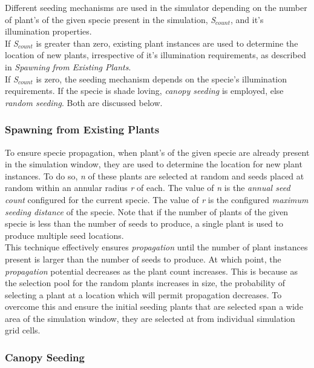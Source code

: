 Different seeding mechanisms are used in the simulator depending on the number of plant's of the given specie present in the simulation, \textit{S$_{count}$}, and it's illumination properties.\\
If \textit{S$_{count}$} is greater than zero, existing plant instances are used to determine the location of new plants, irrespective of it's illumination requirements, as described in \textit{Spawning from Existing Plants}.\\
If \textit{S$_{count}$} is zero, the seeding mechanism depends on the specie's illumination requirements. If the specie is shade loving, \textit{canopy seeding} is employed, else \textit{random seeding}. Both are discussed below.

\subsubsection{Spawning from Existing Plants}

To ensure specie propagation, when plant's of the given specie are already present in the simulation window, they are used to determine the location for new plant instances. To do so, \textit{n} of these plants are selected at random and seeds placed at random within an annular radius \textit{r} of each. The value of \textit{n} is the \textit{annual seed count} configured for the current specie. The value of \textit{r} is the configured \textit{maximum seeding distance} of the specie. Note that if the number of plants of the given specie is less than the number of seeds to produce, a single plant is used to produce multiple seed locations. \\

This technique effectively ensures \textit{propagation} until the number of plant instances present is larger than the number of seeds to produce. At which point, the \textit{propagation} potential decreases as the plant count increases. This is because as the selection pool for the random plants increases in size, the probability of selecting a plant at a location which will permit propagation decreases. To overcome this and ensure the initial seeding plants that are selected span a wide area of the simulation window, they are selected at from individual simulation grid cells.\\

\subsubsection{Canopy Seeding}


